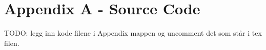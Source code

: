 \chapter{Appendix A - Source Code}
TODO: legg inn kode filene i Appendix mappen og uncomment det som står i tex filen.
%
%
%